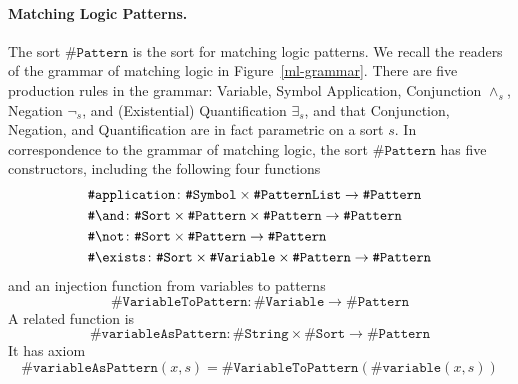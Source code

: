 \documentclass[UTF8,11pt]{article}
\theoremstyle{plain}
\theoremstyle{definition}
\theoremstyle{remark}
\newcommand{\sharpsymbol}{\#}
\newcommand{\KString}{\texttt{\sharpsymbol String}}
\newcommand{\KSort}{\texttt{\sharpsymbol Sort}}
\newcommand{\KSymbol}{\texttt{\sharpsymbol Symbol}}
\newcommand{\KPatternList}{\texttt{\sharpsymbol PatternList}}
\newcommand{\KVariable}{\texttt{\sharpsymbol Variable}}
\newcommand{\KVariableToKPattern}{\texttt{\sharpsymbol VariableToPattern}}
\newcommand{\KvariableAsPattern}{\texttt{\sharpsymbol variableAsPattern}}
\newcommand{\KPattern}{\texttt{\sharpsymbol Pattern}}
\newcommand{\Kvariable}{\texttt{\sharpsymbol variable}}
\newcommand{\Kand}{\texttt{\sharpsymbol  \slashsymbol and}}
\newcommand{\Knot}{\texttt{\sharpsymbol  \slashsymbol not}}
\newcommand{\Kapplication}{\texttt{\sharpsymbol application}}
\newcommand{\Kexists}{\texttt{\sharpsymbol \slashsymbol  exists}}
\newcommand{\slashsymbol}{\symbol{92}}
\begin{document}
\paragraph{Matching Logic Patterns.}
The sort $\KPattern$ is the sort for matching logic patterns.
We recall the readers of the grammar of matching logic in 
Figure~\ref{ml-grammar}.
There are five production rules in the grammar: Variable, Symbol Application, 
Conjunction $\wedge_s$, Negation $\neg_s$, and (Existential) Quantification 
$\exists_s$, and that Conjunction, Negation, and Quantification are in fact 
parametric on a sort $s$.
In correspondence to the grammar of matching logic, the sort $\KPattern$ 
has five constructors, including the following four 
functions
\begin{align*}
  & \Kapplication \colon \KSymbol \times \KPatternList \to \KPattern
  \\
  & \Kand \colon \KSort \times \KPattern \times \KPattern \to \KPattern
  \\
  & \Knot \colon \KSort \times \KPattern \to \KPattern
  \\
  & \Kexists \colon \KSort \times \KVariable \times \KPattern \to \KPattern
\end{align*}
and an injection function from variables to patterns
\begin{equation*}
  \KVariableToKPattern \colon \KVariable \to \KPattern
\end{equation*}
A related function is 
$$
\KvariableAsPattern \colon \KString \times \KSort \to \KPattern
$$
It has axiom
$$
\KvariableAsPattern(x,s) = \KVariableToKPattern(\Kvariable(x,s))
$$
\end{document}
